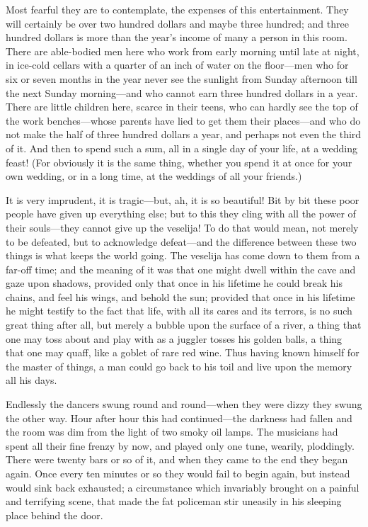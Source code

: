 \documentclass[
]{book}
\theoremstyle{definition}
\theoremstyle{definition}
\theoremstyle{definition}
\theoremstyle{definition}
\theoremstyle{remark}
\begin{document}
Most fearful they are to contemplate, the expenses of this entertainment. They will certainly be over two hundred dollars and maybe three hundred; and three hundred dollars is more than the year's income of many a person in this room. There are able-bodied men here who work from early morning until late at night, in ice-cold cellars with a quarter of an inch of water on the floor---men who for six or seven months in the year never see the sunlight from Sunday afternoon till the next Sunday morning---and who cannot earn three hundred dollars in a year. There are little children here, scarce in their teens, who can hardly see the top of the work benches---whose parents have lied to get them their places---and who do not make the half of three hundred dollars a year, and perhaps not even the third of it. And then to spend such a sum, all in a single day of your life, at a wedding feast! (For obviously it is the same thing, whether you spend it at once for your own wedding, or in a long time, at the weddings of all your friends.)

It is very imprudent, it is tragic---but, ah, it is so beautiful! Bit by bit these poor people have given up everything else; but to this they cling with all the power of their souls---they cannot give up the veselija! To do that would mean, not merely to be defeated, but to acknowledge defeat---and the difference between these two things is what keeps the world going. The veselija has come down to them from a far-off time; and the meaning of it was that one might dwell within the cave and gaze upon shadows, provided only that once in his lifetime he could break his chains, and feel his wings, and behold the sun; provided that once in his lifetime he might testify to the fact that life, with all its cares and its terrors, is no such great thing after all, but merely a bubble upon the surface of a river, a thing that one may toss about and play with as a juggler tosses his golden balls, a thing that one may quaff, like a goblet of rare red wine. Thus having known himself for the master of things, a man could go back to his toil and live upon the memory all his days.

Endlessly the dancers swung round and round---when they were dizzy they swung the other way. Hour after hour this had continued---the darkness had fallen and the room was dim from the light of two smoky oil lamps. The musicians had spent all their fine frenzy by now, and played only one tune, wearily, ploddingly. There were twenty bars or so of it, and when they came to the end they began again. Once every ten minutes or so they would fail to begin again, but instead would sink back exhausted; a circumstance which invariably brought on a painful and terrifying scene, that made the fat policeman stir uneasily in his sleeping place behind the door.
\end{document}
